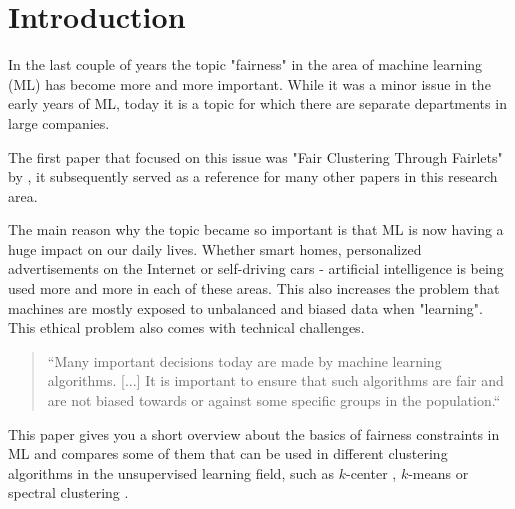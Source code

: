 \section{Introduction}

In the last couple of years the topic "fairness" in the area of machine learning (ML) has become more and more important. While it was a minor issue in the early years of ML, today it is a topic for which there are separate departments in large companies.

The first paper that focused on this issue was "Fair Clustering Through Fairlets" by \textcite{Chierichetti2018}, it subsequently served as a reference for many other papers in this research area.

The main reason why the topic became so important is that ML is now having a huge impact on our daily lives. Whether smart homes, personalized advertisements on the Internet or self-driving cars - artificial intelligence is being used more and more in each of these areas. This also increases the problem that machines are mostly exposed to unbalanced and biased data when "learning". This ethical problem also comes with technical challenges.

\begin{quote}
    ``Many important decisions today are made by machine learning algorithms. [...] It is important to ensure that such algorithms are fair and are not biased towards or against some specific groups in the population.``
    
\autocite[1]{Bera2019}
\end{quote}


This paper gives you a short overview about the basics of fairness constraints in ML and compares some of them that can be used in different clustering algorithms in the unsupervised learning \autocite[]{Barlow1989} field, such as $k$-center \autocite[]{Chierichetti2018}, $k$-means \autocite[]{Schmidt2018} or spectral clustering \autocite[]{Kleindessner2019}.

